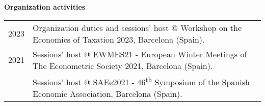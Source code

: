 \textbf{Organization activities}

\begin{tabular}{rp{}}	
	\textsc{2023}	& Organization duties and sessions' host @ Workshop on the Economics of Taxation 2023, \faMapMarker \hspace{0.5 mm} Barcelona (Spain). \\	
	\textsc{2021}	& Sessions' host @ EWMES21 - European Winter Meetings of The Econometric Society 2021, \faMapMarker \hspace{0.5 mm} Barcelona (Spain). \\
								& Sessions' host @ SAEe2021 - 46\textsuperscript{th} Symposium of the Spanish Economic Association, \faMapMarker \hspace{0.5 mm} Barcelona (Spain). \\
								
\end{tabular}

\vspace{3 mm}